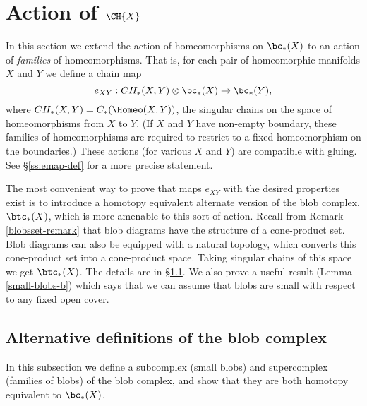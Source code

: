 
\section{Action of \texorpdfstring{$\CH{X}$}{C*(Homeo(M))}}
\label{sec:evaluation}

In this section we extend the action of homeomorphisms on $\bc_*(X)$
to an action of {\it families} of homeomorphisms.
That is, for each pair of homeomorphic manifolds $X$ and $Y$
we define a chain map
\[
    e_{XY} : CH_*(X, Y) \otimes \bc_*(X) \to \bc_*(Y) ,
\]
where $CH_*(X, Y) = C_*(\Homeo(X, Y))$, the singular chains on the space
of homeomorphisms from $X$ to $Y$.
(If $X$ and $Y$ have non-empty boundary, these families of homeomorphisms
are required to restrict to a fixed homeomorphism on the boundaries.)
These actions (for various $X$ and $Y$) are compatible with gluing.
See \S \ref{ss:emap-def} for a more precise statement.

The most convenient way to prove that maps $e_{XY}$ with the desired properties exist is to 
introduce a homotopy equivalent alternate version of the blob complex, $\btc_*(X)$,
which is more amenable to this sort of action.
Recall from Remark \ref{blobsset-remark} that blob diagrams
have the structure of a cone-product set.
Blob diagrams can also be equipped with a natural topology, which converts this
cone-product set into a cone-product space.
Taking singular chains of this space we get $\btc_*(X)$.
The details are in \S \ref{ss:alt-def}.
We also prove a useful result (Lemma \ref{small-blobs-b}) which says that we can assume that
blobs are small with respect to any fixed open cover.



%


\subsection{Alternative definitions of the blob complex}
\label{ss:alt-def}

\newcommand\sbc{\bc^{\cU}}

In this subsection we define a subcomplex (small blobs) and supercomplex (families of blobs)
of the blob complex, and show that they are both homotopy equivalent to $\bc_*(X)$.

